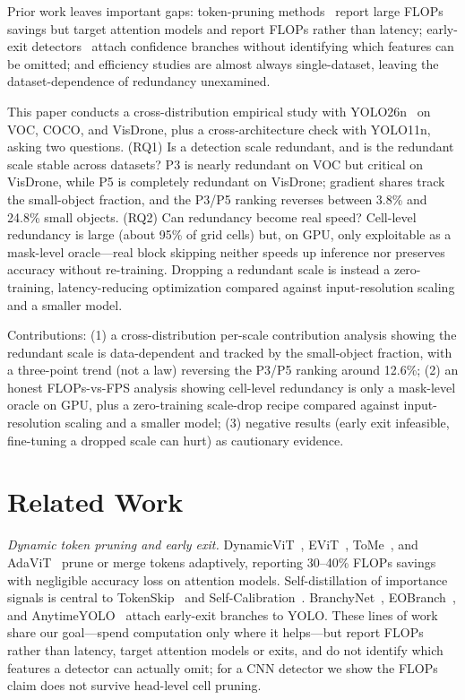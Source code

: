 \documentclass[3p]{elsarticle}
\begin{document}
Prior work leaves important gaps: token-pruning methods~\cite{rao2021dynamicvit,liang2022evit,bolya2023tome,meng2021adavit} report large FLOPs savings but target attention models and report FLOPs rather than latency; early-exit detectors~\cite{teerapittayanon2016branchynet,scholte2025eobranch,anytimeyolo2025} attach confidence branches without identifying which features can be omitted; and efficiency studies are almost always single-dataset, leaving the dataset-dependence of redundancy unexamined.

This paper conducts a cross-distribution empirical study with YOLO26n~\cite{jocher2026ultralyticsyolo26unifiedrealtime} on VOC, COCO, and VisDrone, plus a cross-architecture check with YOLO11n, asking two questions. (RQ1) Is a detection scale redundant, and is the redundant scale stable across datasets? P3 is nearly redundant on VOC but critical on VisDrone, while P5 is completely redundant on VisDrone; gradient shares track the small-object fraction, and the P3/P5 ranking reverses between 3.8\% and 24.8\% small objects. (RQ2) Can redundancy become real speed? Cell-level redundancy is large (about 95\% of grid cells) but, on GPU, only exploitable as a mask-level oracle---real block skipping neither speeds up inference nor preserves accuracy without re-training. Dropping a redundant scale is instead a zero-training, latency-reducing optimization compared against input-resolution scaling and a smaller model.

Contributions: (1) a cross-distribution per-scale contribution analysis showing the redundant scale is data-dependent and tracked by the small-object fraction, with a three-point trend (not a law) reversing the P3/P5 ranking around 12.6\%; (2) an honest FLOPs-vs-FPS analysis showing cell-level redundancy is only a mask-level oracle on GPU, plus a zero-training scale-drop recipe compared against input-resolution scaling and a smaller model; (3) negative results (early exit infeasible, fine-tuning a dropped scale can hurt) as cautionary evidence.

\section{Related Work}\label{sec:related}
\emph{Dynamic token pruning and early exit.} DynamicViT~\cite{rao2021dynamicvit}, EViT~\cite{liang2022evit}, ToMe~\cite{bolya2023tome}, and AdaViT~\cite{meng2021adavit} prune or merge tokens adaptively, reporting 30--40\% FLOPs savings with negligible accuracy loss on attention models. Self-distillation of importance signals is central to TokenSkip~\cite{xia2025tokenskip} and Self-Calibration~\cite{huang2025selfcalib}. BranchyNet~\cite{teerapittayanon2016branchynet}, EOBranch~\cite{scholte2025eobranch}, and AnytimeYOLO~\cite{anytimeyolo2025} attach early-exit branches to YOLO. These lines of work share our goal---spend computation only where it helps---but report FLOPs rather than latency, target attention models or exits, and do not identify which features a detector can actually omit; for a CNN detector we show the FLOPs claim does not survive head-level cell pruning.
\end{document}
